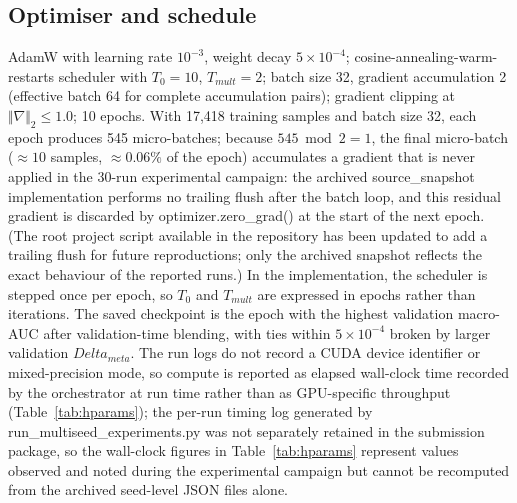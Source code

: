 \documentclass[mathematics,article,submit,pdftex]{Definitions/mdpi}
\def\texttt#1{#1}%
\def\mathrm#1{#1}%
\def\Delta{Delta }%
\begin{document}
\subsection{Optimiser and schedule}
AdamW with learning rate $10^{-3}$, weight decay $5{\times}10^{-4}$; cosine-annealing-warm-restarts scheduler with $T_0{=}10$, $T_{\mathrm{mult}}{=}2$; batch size 32, gradient accumulation 2 (effective batch 64 for complete accumulation pairs); gradient clipping at $\Vert\nabla\Vert_{2}{\leq}1.0$; 10 epochs. With 17{,}418 training samples and batch size 32, each epoch produces 545 micro-batches; because $545 \bmod 2 {=} 1$, the final micro-batch (${\approx}10$ samples, ${\approx}0.06\%$ of the epoch) accumulates a gradient that is never applied in the 30-run experimental campaign: the archived \texttt{source\_snapshot} implementation performs no trailing flush after the batch loop, and this residual gradient is discarded by \texttt{optimizer.zero\_grad()} at the start of the next epoch. (The root project script available in the repository has been updated to add a trailing flush for future reproductions; only the archived snapshot reflects the exact behaviour of the reported runs.) In the implementation, the scheduler is stepped once per epoch, so $T_0$ and $T_{\mathrm{mult}}$ are expressed in epochs rather than iterations. The saved checkpoint is the epoch with the highest validation macro-AUC after validation-time blending, with ties within $5{\times}10^{-4}$ broken by larger validation $\Delta_{\mathrm{meta}}$. The run logs do not record a CUDA device identifier or mixed-precision mode, so compute is reported as elapsed wall-clock time recorded by the orchestrator at run time rather than as GPU-specific throughput (Table~\ref{tab:hparams}); the per-run timing log generated by \texttt{run\_multiseed\_experiments.py} was not separately retained in the submission package, so the wall-clock figures in Table~\ref{tab:hparams} represent values observed and noted during the experimental campaign but cannot be recomputed from the archived seed-level JSON files alone.
\end{document}
